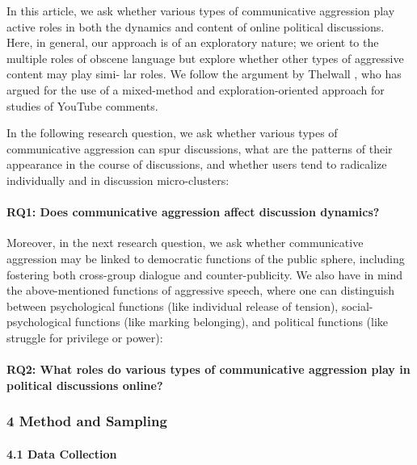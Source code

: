 In this article, we ask whether various types of communicative aggression play active roles in both the dynamics and content of online political discussions. Here, in general, our approach is of an exploratory nature; we orient to the multiple roles of obscene language but explore whether other types of aggressive content may play simi- lar roles. We follow the argument by Thelwall \cite{Thelwall2018}, who has argued for the use of a mixed-method and exploration-oriented approach for studies of YouTube comments.

In the following research question, we ask whether various types of communicative aggression can spur discussions, what are the patterns of their appearance in the course of discussions, and whether users tend to radicalize individually and in discussion micro-clusters:

\paragraph{RQ1: Does communicative aggression affect discussion dynamics?}

Moreover, in the next research question, we ask whether communicative aggression may be linked to democratic functions of the public sphere, including fostering both cross-group dialogue and counter-publicity. We also have in mind the above-mentioned functions of aggressive speech, where one can distinguish between psychological functions (like individual release of tension), social-psychological functions (like marking belonging), and political functions (like struggle for privilege or power):

\paragraph{RQ2: What roles do various types of communicative aggression play in political discussions online?}

\subsubsection{4 Method and Sampling}

\paragraph{4.1 Data Collection}

